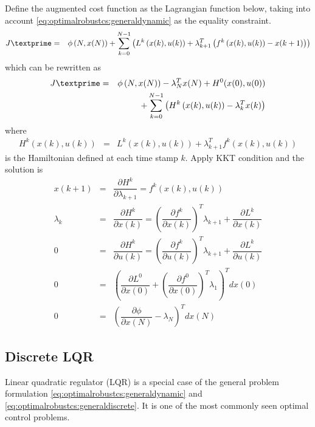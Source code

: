 Define the augmented cost function as the Lagrangian function below, taking into account \eqref{eq:optimalrobustcs:generaldynamic} as the equality constraint.
\begin{eqnarray}
	J\textprime &=& \phi\left(N, x(N)\right) + \sum_{k=0}^{N-1}\left(L^k\left(x(k), u(k)\right) + \lambda_{k+1}^T\left(f^k\left(x(k), u(k)\right) - x(k+1)\right)\right) \nonumber
\end{eqnarray}
which can be rewritten as
\begin{eqnarray}
	J\textprime &=& \phi\left(N, x(N)\right) - \lambda_N^Tx(N) + H^0(x(0), u(0)) \nonumber \\
	&& + \sum_{k=0}^{N-1}\left(H^k\left(x(k), u(k)\right) - \lambda_k^Tx(k)\right) \nonumber
\end{eqnarray}
where
\begin{eqnarray}
	H^k\left(x(k), u(k)\right) &=& L^k\left(x(k), u(k)\right) + \lambda_{k+1}^Tf^k\left(x(k), u(k)\right) \nonumber
\end{eqnarray}
is the Hamiltonian defined at each time stamp $k$. Apply KKT condition and the solution is
\begin{eqnarray}
	x(k+1) &=& \dfrac{\partial H^k}{\partial \lambda_{k+1}} = f^k\left(x(k), u(k)\right) \nonumber \\
	\lambda_k &=& \dfrac{\partial H^k}{\partial x(k)} = \left(\dfrac{\partial f^k}{\partial x(k)}\right)^T\lambda_{k+1} + \dfrac{\partial L^k}{\partial x(k)} \nonumber \\
	0 &=& \dfrac{\partial H^k}{\partial u(k)} = \left(\dfrac{\partial f^k}{\partial u(k)}\right)^T\lambda_{k+1} + \dfrac{\partial L^k}{\partial u(k)} \nonumber \\
	0 &=& \left(\dfrac{\partial L^0}{\partial x(0)} + \left(\dfrac{\partial f^0}{\partial x(0)}\right)^T\lambda_1\right)^Tdx(0) \nonumber \\
	0 &=& \left(\dfrac{\partial \phi}{\partial x(N)}-\lambda_N\right)^Tdx(N) \nonumber
\end{eqnarray}

\subsection{Discrete LQR}

Linear quadratic regulator (LQR) is a special case of the general problem formulation \eqref{eq:optimalrobustcs:generaldynamic} and \eqref{eq:optimalrobustcs:generaldiscrete}. It is one of the most commonly seen optimal control problems.

